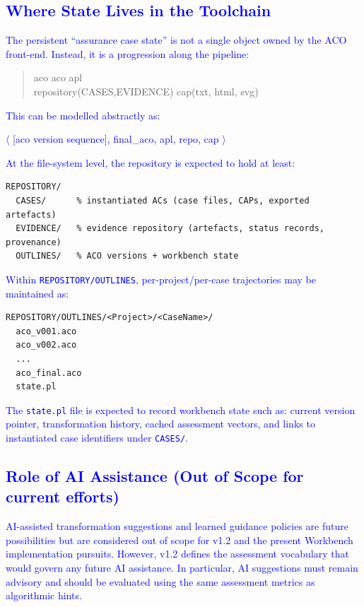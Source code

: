 \documentclass[11pt]{article}
\newcommand{\pipeline}{\textrightarrow}
\begin{document}
\subsection{\textcolor{blue}{Where State Lives in the Toolchain}}

\textcolor{blue}{The persistent ``assurance case state'' is not a single object owned by the ACO front-end. Instead, it is a progression along the pipeline:}

\begin{quote}\ttfamily\small\raggedright
aco \pipeline [ACO-WORKBENCH] \pipeline aco \pipeline [ACO-to-APL] \pipeline apl \pipeline [INSTANTIATE]\\
\pipeline repository(CASES,EVIDENCE) \pipeline [EXPORT\_AC] \pipeline cap(txt, html, svg)
\end{quote}

\textcolor{blue}{This can be modelled abstractly as:}
\begin{center}
\textcolor{blue}{$\langle$ [aco version sequence], final\_aco, apl, repo, cap $\rangle$}
\end{center}

\textcolor{blue}{At the file-system level, the repository is expected to hold at least:}
\begin{verbatim}
REPOSITORY/
  CASES/      % instantiated ACs (case files, CAPs, exported artefacts)
  EVIDENCE/   % evidence repository (artefacts, status records, provenance)
  OUTLINES/   % ACO versions + workbench state
\end{verbatim}

\textcolor{blue}{Within \texttt{REPOSITORY/OUTLINES}, per-project/per-case trajectories may be maintained as:}
\begin{verbatim}
REPOSITORY/OUTLINES/<Project>/<CaseName>/
  aco_v001.aco
  aco_v002.aco
  ...
  aco_final.aco
  state.pl
\end{verbatim}

\textcolor{blue}{The \texttt{state.pl} file is expected to record workbench state such as: current version pointer, transformation history, cached assessment vectors, and links to instantiated case identifiers under \texttt{CASES/}.}

\subsection{\textcolor{blue}{Role of AI Assistance (Out of Scope for current efforts)}}

\textcolor{blue}{AI-assisted transformation suggestions and learned guidance policies are future possibilities but are considered out of scope for v1.2 and the present Workbench implementation pursuits. However, v1.2 defines the assessment vocabulary that would govern any future AI assistance. In particular, AI suggestions must remain advisory and should be evaluated using the same assessment metrics as algorithmic hints.}
\end{document}
